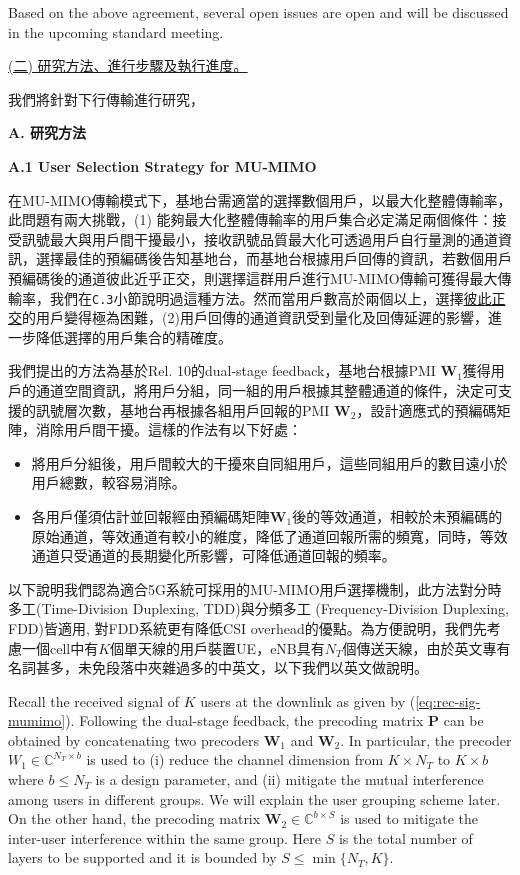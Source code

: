 \documentclass[a4paper,12pt]{article}%
\begin{document}
Based on the above agreement, several open issues are open and will be discussed in the upcoming standard meeting. 




\noindent \underline{(二)	研究方法、進行步驟及執行進度。} 

我們將針對下行傳輸進行研究，

\noindent \textbf{A. 研究方法}

\noindent \textbf{A.1 User Selection Strategy for MU-MIMO}

在MU-MIMO傳輸模式下，基地台需適當的選擇數個用戶，以最大化整體傳輸率，此問題有兩大挑戰，(1) 能夠最大化整體傳輸率的用戶集合必定滿足兩個條件：接受訊號最大與用戶間干擾最小，接收訊號品質最大化可透過用戶自行量測的通道資訊，選擇最佳的預編碼後告知基地台，而基地台根據用戶回傳的資訊，若數個用戶預編碼後的通道彼此近乎正交，則選擇這群用戶進行MU-MIMO傳輸可獲得最大傳輸率，我們在\texttt{C.3}小節說明過這種方法。然而當用戶數高於兩個以上，選擇\underline{彼此正交}的用戶變得極為困難，(2)用戶回傳的通道資訊受到量化及回傳延遲的影響，進一步降低選擇的用戶集合的精確度。

我們提出的方法為基於Rel. 10的dual-stage feedback，基地台根據PMI $\mathbf{W}_1$獲得用戶的通道空間資訊，將用戶分組，同一組的用戶根據其整體通道的條件，決定可支援的訊號層次數，基地台再根據各組用戶回報的PMI $\mathbf{W}_2$，設計適應式的預編碼矩陣，消除用戶間干擾。這樣的作法有以下好處：
\begin{itemize}
\item 將用戶分組後，用戶間較大的干擾來自同組用戶，這些同組用戶的數目遠小於用戶總數，較容易消除。
\item 各用戶僅須估計並回報經由預編碼矩陣$\mathbf{W}_1$後的等效通道，相較於未預編碼的原始通道，等效通道有較小的維度，降低了通道回報所需的頻寬，同時，等效通道只受通道的長期變化所影響，可降低通道回報的頻率。
\end{itemize}

以下說明我們認為適合5G系統可採用的MU-MIMO用戶選擇機制，此方法對分時多工(Time-Division Duplexing, TDD)與分頻多工 (Frequency-Division Duplexing, FDD)皆適用, 對FDD系統更有降低CSI overhead的優點。為方便說明，我們先考慮一個cell中有$K$個單天線的用戶裝置UE，eNB具有$N_T$個傳送天線，由於英文專有名詞甚多，未免段落中夾雜過多的中英文，以下我們以英文做說明。

Recall the received signal of $K$ users at the downlink as given by (\ref{eq:rec-sig-mumimo}). Following the dual-stage feedback, the precoding matrix $\mathbf{P}$ can be obtained by concatenating two precoders $\mathbf{W}_1$ and $\mathbf{W}_2$. In particular, the precoder $W_1 \in \mathbb{C}^{N_T \times b}$ is used to (i) reduce the channel dimension from $K\times N_T$ to $K\times b$ where $b \leq N_T$ is a design parameter, and (ii) mitigate the mutual interference among users in different groups. We will explain the user grouping scheme later. On the other hand, the precoding matrix $\mathbf{W}_2 \in \mathbb{C}^{b\times S}$ is used to mitigate the inter-user interference within the same group. Here $S$ is the total number of layers to be supported and it is bounded by $S \leq \min\{ N_T, K \}$.
\end{document}
